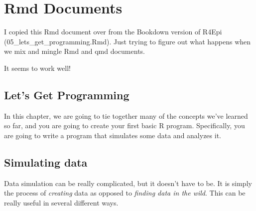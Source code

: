 \documentclass[
  letterpaper,
  DIV=11,
  numbers=noendperiod]{scrreprt}
\begin{document}
\chapter{Rmd Documents}\label{rmd-documents}

I copied this Rmd document over from the Bookdown version of R4Epi
(05\_lets\_get\_programming.Rmd). Just trying to figure out what happens
when we mix and mingle Rmd and qmd documents.

It seems to work well!

\section{Let's Get Programming}\label{lets-get-programming}

In this chapter, we are going to tie together many of the concepts we've
learned so far, and you are going to create your first basic R program.
Specifically, you are going to write a program that simulates some data
and analyzes it.

\section{Simulating data}\label{simulating-data}

Data simulation can be really complicated, but it doesn't have to be. It
is simply the process of \emph{creating} data as opposed to
\emph{finding data in the wild}. This can be really useful in several
different ways.
\end{document}
